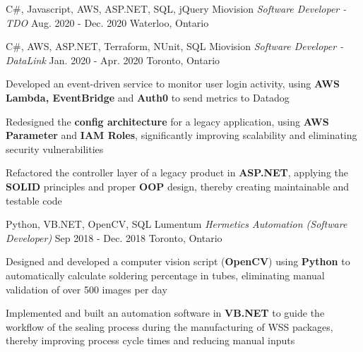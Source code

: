 \begin{siderules}
  \begin{cventries}
    \cventry
    {C#, Javascript, AWS, ASP.NET, SQL, jQuery}
    {Miovision \hspace{0.15em} \bodyfontlight\itshape{Software Developer - TDO}}
    {Aug. 2020 - Dec. 2020}
    {Waterloo, Ontario}
    {
      \begin{cvitems}
        \item {}
        \item {}
        \item {}
      \end{cvitems}
    }
    \cventry
    {C#, AWS, ASP.NET, Terraform, NUnit, SQL}
    {Miovision \hspace{0.15em} \bodyfontlight\itshape{Software Developer - DataLink}}
    {Jan. 2020 - Apr. 2020}
    {Toronto, Ontario}
    {
      \begin{cvitems}
        \item {Developed an event-driven service to monitor user login activity, using \textbf{AWS Lambda, EventBridge} and \textbf{Auth0} to send metrics to Datadog}
        \item {Redesigned the \textbf{config architecture} for a legacy application, using \textbf{AWS Parameter} and \textbf{IAM Roles}, significantly improving scalability and eliminating security vulnerabilities}
        \item {Refactored the controller layer of a legacy product in \textbf{ASP.NET}, applying the \textbf{SOLID} principles and proper \textbf{OOP} design, thereby creating maintainable and testable code}
      \end{cvitems}
    }
    \cventry
      {Python, VB.NET, OpenCV, SQL}
      {Lumentum \hspace{0.15em} \bodyfontlight\itshape{Hermetics Automation (Software Developer)}}
      {Sep 2018 - Dec. 2018}
      {Toronto, Ontario}
      {
        \begin{cvitems}
          \item {Designed and developed a computer vision script (\textbf{OpenCV}) using \textbf{Python} to automatically calculate soldering percentage in tubes, eliminating manual validation of over 500 images per day}
          \item {Implemented and built an automation software in \textbf{VB.NET} to guide the workflow of the sealing process during the manufacturing of WSS packages, thereby improving process cycle times and reducing manual inputs}

\end{cvitems}}
\end{cventries}
\end{siderules}
